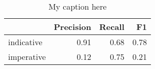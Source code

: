 \begin{table}[!ht]
\centering
\begin{tabular}{lrrr}
\toprule
{} &  Precision &  Recall &   F1 \\
\midrule
indicative &       0.91 &    0.68 & 0.78 \\
imperative &       0.12 &    0.75 & 0.21 \\
\bottomrule
\end{tabular}
\caption{My caption here}
\label{tab:MOOD-ocd-combined-F1}
\end{table}